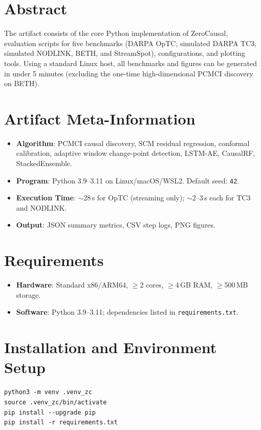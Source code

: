\section{Abstract}

The artifact consists of the core Python implementation of ZeroCausal, evaluation scripts for five benchmarks (DARPA OpTC, simulated DARPA TC3, simulated NODLINK, BETH, and StreamSpot), configurations, and plotting tools. Using a standard Linux host, all benchmarks and figures can be generated in under 5 minutes (excluding the one-time high-dimensional PCMCI discovery on BETH).

\section{Artifact Meta-Information}

\begin{itemize}
\item \textbf{Algorithm}: PCMCI causal discovery, SCM residual regression, conformal calibration, adaptive window change-point detection, LSTM-AE, CausalRF, StackedEnsemble.
\item \textbf{Program}: Python 3.9--3.11 on Linux/macOS/WSL2. Default seed: \texttt{42}.
\item \textbf{Execution Time}: $\sim$28\,s for OpTC (streaming only); $\sim$2--3\,s each for TC3 and NODLINK.
\item \textbf{Output}: JSON summary metrics, CSV step logs, PNG figures.
\end{itemize}

\section{Requirements}

\begin{itemize}
\item \textbf{Hardware}: Standard x86/ARM64, $\geq$2 cores, $\geq$4\,GB RAM, $\geq$500\,MB storage.
\item \textbf{Software}: Python 3.9--3.11; dependencies listed in \texttt{requirements.txt}.
\end{itemize}

\section{Installation and Environment Setup}

\begin{lstlisting}[caption={Environment setup commands}]
python3 -m venv .venv_zc
source .venv_zc/bin/activate
pip install --upgrade pip
pip install -r requirements.txt
\end{lstlisting}

